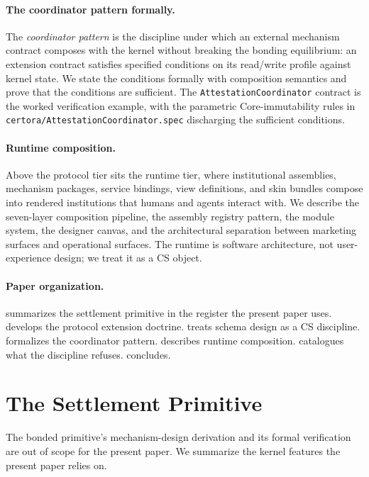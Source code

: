 \documentclass[11pt,a4paper]{article}
\theoremstyle{definition}
\theoremstyle{remark}
\begin{document}
\paragraph{The coordinator pattern formally.}
The \emph{coordinator pattern} is the discipline under which an
external mechanism contract composes with the kernel without breaking
the bonding equilibrium: an extension contract satisfies specified
conditions on its read/write profile against kernel state. We state
the conditions formally with composition semantics and prove that
the conditions are sufficient. The \texttt{AttestationCoordinator}
contract is the worked verification example, with the parametric
Core-immutability rules in
\texttt{certora/AttestationCoordinator.spec} discharging the
sufficient conditions.

\paragraph{Runtime composition.}
Above the protocol tier sits the runtime tier, where institutional
assemblies, mechanism packages, service bindings, view
definitions, and skin bundles compose into rendered institutions
that humans and agents interact with. We describe the seven-layer
composition pipeline, the assembly registry pattern, the module
system, the designer canvas, and the architectural separation
between marketing surfaces and operational surfaces. The runtime
is software architecture, not user-experience design; we treat it
as a CS object.

\paragraph{Paper organization.}
 summarizes the settlement primitive in the
register the present paper uses.
 develops the protocol extension doctrine.
 treats schema design as a CS discipline.
 formalizes the coordinator pattern.
 describes runtime composition.
 catalogues what the discipline refuses.
 concludes.

\section{The Settlement Primitive}
\label{sec:primitive}

The bonded primitive's mechanism-design derivation and its formal
verification are out of scope for the present paper. We summarize the
kernel features the present paper relies on.
\end{document}
